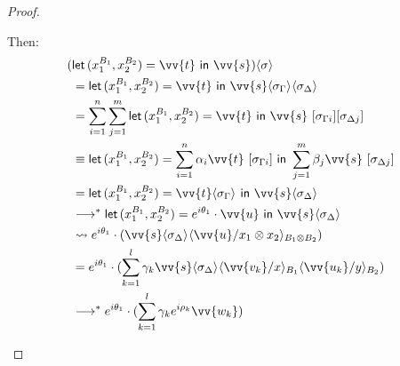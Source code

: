 \documentclass[runningheads,orivec,envcountsame,envcountsect]{llncs}
\newcommand\lra{\longrightarrow}
\newcommand\ansubst[2]{\ensuremath{\langle #1 \rangle_{#2}}}
\def\Pair#1#2{(#1,#2)} %
\def\letkeyword{\mathsf{let}}
\def\inkeyword{\mathsf{in}}
\def\LetP#1#2#3#4#5#6{\letkeyword\,\Pair{#1^{#2}}{#3^{#4}}=#5~\inkeyword~#6}
\def\lraneq{\rightsquigarrow}
\def\eval{\lra^*}
\begin{document}
\begin{proof}
\begin{description}
    Then:
    \begin{align*}
        (&\LetP{x_1}{B_1}{x_2}{B_2}{\vv{t}}{\vv{s}})\ansubst{\sigma}{} \\
        &= \LetP{x_1}{B_1}{x_2}{B_2}{\vv{t}}{\vv{s}}\ansubst{\sigma_\Gamma}{}\ansubst{\sigma_\Delta}{}\\
        &=\sum_{i=1}^{n}\sum_{j=1}^{m}\LetP{x_1}{B_1}{x_2}{B_2}{\vv{t}}{\vv{s}}\ [\sigma_{\Gamma i}][\sigma_{\Delta j}]\\
        &\equiv \LetP{x_1}{B_1}{x_2}{B_2}{\sum_{i=1}^{n}\alpha_i\vv{t}\ [\sigma_{\Gamma i}]}{\sum_{j=1}^{m}\beta_j \vv{s}\ [\sigma_{\Delta j}]}\\
        &=\LetP{x_1}{B_1}{x_2}{B_2}{\vv{t}\ansubst{\sigma_\Gamma}{}}{\vv{s}\ansubst{\sigma_\Delta}{}}\\
        &\eval\LetP{x_1}{B_1}{x_2}{B_2}{e^{i\theta_1}\cdot\vv{u}}{\vv{s}\ansubst{\sigma_\Delta}{}}\\
        &\lraneq e^{i\theta_1}\cdot(\vv{s}\ansubst{\sigma_\Delta}{}\ansubst{\vv{u}/x_1\otimes x_2}{B_1\otimes B_2})\\
        &=e^{i\theta_1}\cdot(\sum_{k=1}^{l}\gamma_k\vv{s}\ansubst{\sigma_\Delta}{}\ansubst{\vv{v_k}/x}{B_1}\ansubst{\vv{u_k}/y}{B_2})\\
        &\eval e^{i\theta_1}\cdot(\sum_{k=1}^{l}\gamma_k e^{i\rho_k} \vv{w_k})\\
    \end{align*}


\end{description}
\end{proof}
\end{document}
